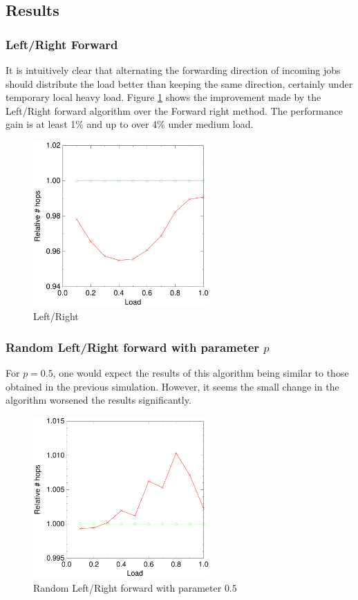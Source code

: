 \documentclass[10pt,a4paper]{article}
\begin{document}
\subsection{Results}
\label{simresults}

\subsubsection*{Left/Right Forward}
It is intuitively clear that alternating the forwarding direction of incoming jobs should distribute the load better than keeping the same direction, certainly under temporary local heavy load. Figure \ref{figlr} shows the improvement made by the Left/Right forward algorithm over the Forward right method. The performance gain is at least 1\% and up to over 4\% under medium load.

\begin{figure}[h!tb]
\centering
\includegraphics[width=0.6\textwidth]{data/switchright.pdf}
\caption{Left/Right}
\label{figlr}
\end{figure}


\subsubsection*{Random Left/Right forward with parameter $p$}
For $p=0.5$, one would expect the results of this algorithm being similar to those obtained in the previous simulation. However, it seems the small change in the algorithm worsened the results significantly.

\begin{figure}[h!tb]
\centering
\includegraphics[width=0.6\textwidth]{data/randswitchright.pdf}
\caption{Random Left/Right forward with parameter $0.5$}
\label{figrandswitch}
\end{figure}
\end{document}
